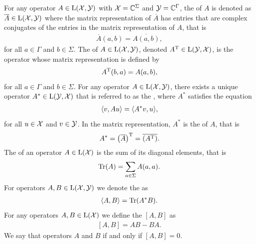 For any operator $A \in \mathrm{L}(\mathcal{X},\mathcal{Y})$ with $\mathcal{X} = \mathbb{C}^{\Sigma}$ and $\mathcal{Y} = \mathbb{C}^{\Gamma}$, the  of $A$ is denoted as $\overline{A} \in \mathrm{L}(\mathcal{X},\mathcal{Y})$ where the matrix representation of $\overline{A}$ has entries that are complex conjugates of the entries in the matrix representation of $A$, that is
\begin{align}
	\overline{A}(a,b) = \overline{A(a,b)},
\end{align}
for all $a \in \Gamma$ and $b \in \Sigma$. The  of $A \in \mathrm{L}(\mathcal{X},\mathcal{Y})$, denoted $A^{\mathrm{T}} \in \mathrm{L}(\mathcal{Y},\mathcal{X})$, is the operator whose matrix representation is defined by 
\begin{align}
	A^{\mathrm{T}}(b,a) = A(a,b),
\end{align}
for all $a \in \Gamma$ and $b \in \Sigma$. For any operator $A \in \mathrm{L}(\mathcal{X},\mathcal{Y})$, there exists a unique operator $A^* \in \mathrm{L}(\mathcal{Y},\mathcal{X})$ that is referred to as the , where $A^*$ satisfies the equation
\begin{align}
	\langle v , Au\rangle = \langle A^*v , u\rangle,
\end{align}
for all $u \in \mathcal{X}$ and $v \in \mathcal{Y}$. In the matrix representation, $A^*$ is the  of $A$, that is
\begin{align}
	A^* = \left(\overline{A}\right)^{\mathrm{T}} = \overline{\left( A^{\mathrm{T}}\right)}.
\end{align}
The  of an operator $A \in \mathrm{L}(\mathcal{X})$ is the sum of its diagonal elements, that is
\begin{align} \label{eq:trace}
	\operatorname{Tr}(A) = \sum_{a \in \Sigma} A(a,a).
\end{align}
For operators $A,B \in \mathrm{L}(\mathcal{X},\mathcal{Y})$ we denote the  as 
\begin{align}
	\langle A , B\rangle = \operatorname{Tr}(A^*B). 
\end{align}
For any operators $A,B \in \mathrm{L}(\mathcal{X})$ we define the  $\left[A,B\right]$ as 
\begin{align}
	\left[A,B\right] = AB - BA. 
\end{align} 
We say that operators $A$ and $B$  if and only if $\left[A,B\right]=0$. 

